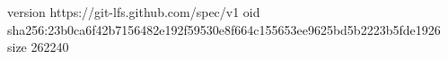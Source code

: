 version https://git-lfs.github.com/spec/v1
oid sha256:23b0ca6f42b7156482e192f59530e8f664c155653ee9625bd5b2223b5fde1926
size 262240
